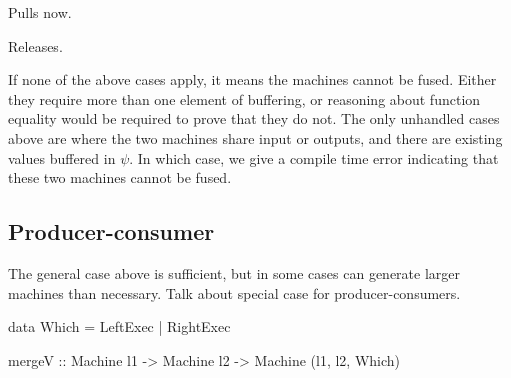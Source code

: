 Pulls now.

Releases.

If none of the above cases apply, it means the machines cannot be fused.
Either they require more than one element of buffering, or reasoning about function equality would be required to prove that they do not.
The only unhandled cases above are where the two machines share input or outputs, and there are existing values buffered in $\psi$.
In which case, we give a compile time error indicating that these two machines cannot be fused.




\subsection{Producer-consumer}
The general case above is sufficient, but in some cases can generate larger machines than necessary.
Talk about special case for producer-consumers.

\begin{code}
data Which = LeftExec | RightExec

mergeV :: Machine l1 -> Machine l2
       -> Machine (l1, l2, Which)
\end{code}

